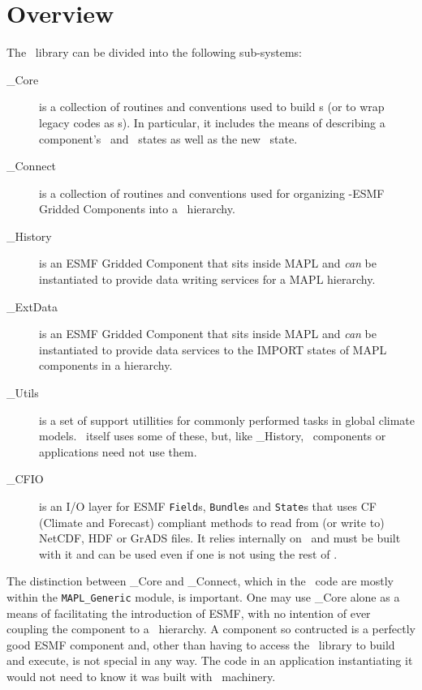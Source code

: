 \section{Overview}
The \ggn \ library can be divided into the following sub-systems:
\begin{description}

\item[\ggn\_Core] is a collection of routines and conventions used to
  build \egc s (or to wrap legacy codes as \egc s). In particular, it
  includes the means of describing a component's \im\ and \ex\ states
  as well as the new \gin\ state.

\item[\ggn\_Connect] is a collection of routines and conventions used for
  organizing \ggn-ESMF Gridded Components into a \ggn\ hierarchy.
  
\item[\ggn\_History] is an ESMF Gridded Component that sits inside MAPL and
  \emph{can} be instantiated to provide data writing services for a MAPL
  hierarchy.

\item[\ggn\_ExtData] is an ESMF Gridded Component that sits inside MAPL and
  \emph{can} be instantiated to provide data services to the IMPORT states
  of MAPL components in a hierarchy.

\item[\ggn\_Utils] is a set of support utillities for commonly performed
  tasks in global climate models. \ggn\ itself uses some of these, but,
  like \ggn\_History, \ggn\ components or applications need not use them.

\item[\ggn\_CFIO] is an I/O layer for ESMF \texttt{Field}s, 
  \texttt{Bundle}s and \texttt{State}s that uses CF (Climate and Forecast)
  compliant methods to read from (or write to) NetCDF, HDF or GrADS files.
  It relies internally on \ggn\ and must be built with it and can be used
  even if one is not using the rest of \ggn.

\end{description}

The distinction between \ggn\_Core and \ggn\_Connect, which in
the \ggn\ code are mostly within the \texttt{MAPL\_Generic} module,
is important. One may use \ggn\_Core alone as a means of facilitating the
introduction of ESMF, with no intention of ever coupling the component to a 
\ggn\  hierarchy. A component so contructed is a perfectly good
ESMF component and, other than having to access the \ggn\  library
to build and execute, is not special in any way. The code in 
an application instantiating it would not need to know it was built 
with \ggn\  machinery.


